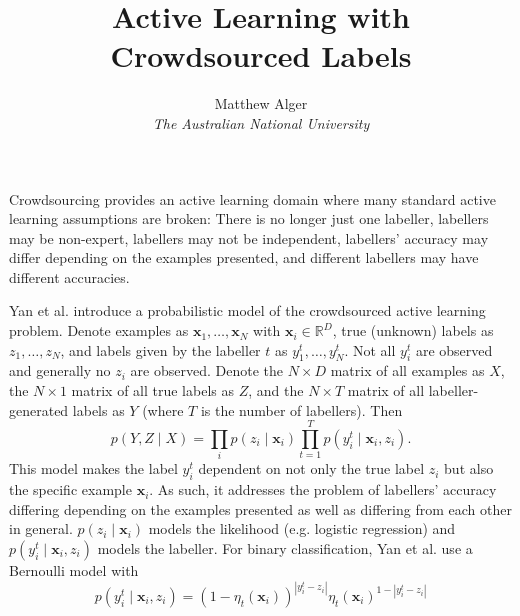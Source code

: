 \documentclass[a4paper]{article}
\renewcommand{\vec}{\mathbf}
\begin{document}
    \title{Active Learning with Crowdsourced Labels}
    \author{Matthew Alger \\ \emph{The Australian National University}}
    \maketitle

    Crowdsourcing provides an active learning domain where many standard active learning assumptions are broken: There is no longer just one labeller, labellers may be non-expert, labellers may not be independent, labellers' accuracy may differ depending on the examples presented, and different labellers may have different accuracies.

    Yan et al.\cite{yan10} introduce a probabilistic model of the crowdsourced active learning problem. Denote examples as $\vec x_1, \dots, \vec x_N$ with $\vec x_i \in \mathbb{R}^D$, true (unknown) labels as $z_1, \dots, z_N$, and labels given by the labeller $t$ as $y^t_1, \dots, y^t_N$. Not all $y^t_i$ are observed and generally no $z_i$ are observed. Denote the $N \times D$ matrix of all examples as $X$, the $N \times 1$ matrix of all true labels as $Z$, and the $N \times T$ matrix of all labeller-generated labels as $Y$ (where $T$ is the number of labellers). Then
    \[
        p(Y, Z \mid X) = \prod_i p(z_i \mid \vec x_i) \prod_{t = 1}^T p(y^t_i \mid \vec x_i, z_i).
    \]
    This model makes the label $y^t_i$ dependent on not only the true label $z_i$ but also the specific example $\vec x_i$. As such, it addresses the problem of labellers' accuracy differing depending on the examples presented as well as differing from each other in general. $p(z_i \mid \vec x_i)$ models the likelihood (e.g. logistic regression) and $p(y^t_i \mid \vec x_i, z_i)$ models the labeller. For binary classification, Yan et al. use a Bernoulli model with
    \[
        p(y^t_i \mid \vec x_i, z_i) = (1 - \eta_t(\vec x_i))^{|y^t_i - z_i|} \eta_t(\vec x_i)^{1 - |y^t_i - z_i|}
    \]

    
    
\end{document}
